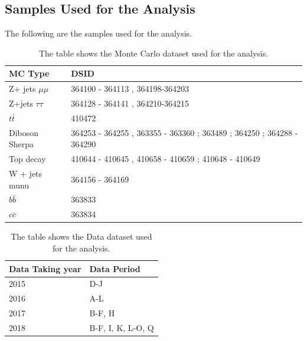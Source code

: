 \subsection{Samples Used for the Analysis}
The following are the samples used for the analysis.

\begin{table}[!htb]
    \begin{center}
    \caption{
        The table shows the Monte Carlo dataset used for the analysis. 
    }
\label{tab:MC samples}
\begin{tabular}{|l|l|}
\hline
\textbf{MC Type}   & \textbf{DSID}                                                         \\ \hline
Z+ jets $\mu\mu$   & 364100 - 364113 , 364198-364203                                       \\ \hline
Z+jets $\tau \tau$ & 364128 - 364141 , 364210-364215                                       \\ \hline
$t\bar{t}$         & 410472                                                                \\ \hline
Diboson Sherpa     & 364253 - 364255 , 363355 - 363360 ; 363489 ; 364250 ; 364288 - 364290 \\ \hline
Top decay          & 410644 - 410645 , 410658 - 410659 ; 410648 - 410649                   \\ \hline
W + jets munu      & 364156 - 364169                                                       \\ \hline
$b\bar{b}$         & 363833                                                                \\ \hline
$c\bar{c}$         & 363834                                                                \\ \hline
\end{tabular}
\end{center}
\end{table}


\begin{table}[!htb]
    \begin{center}
    \caption{
        The table shows the Data dataset used for the analysis. 
    }
\label{tab:MC samples}
\begin{tabular}{|l|l|}
\hline
\textbf{Data Taking year}   & \textbf{Data Period} \\ \hline
2015   & D-J                                       \\ \hline
2016   & A-L                                       \\ \hline
2017   & B-F, H                                    \\ \hline
2018   & B-F, I, K, L-O, Q                         \\ \hline
\end{tabular}
\end{center}
\end{table}


